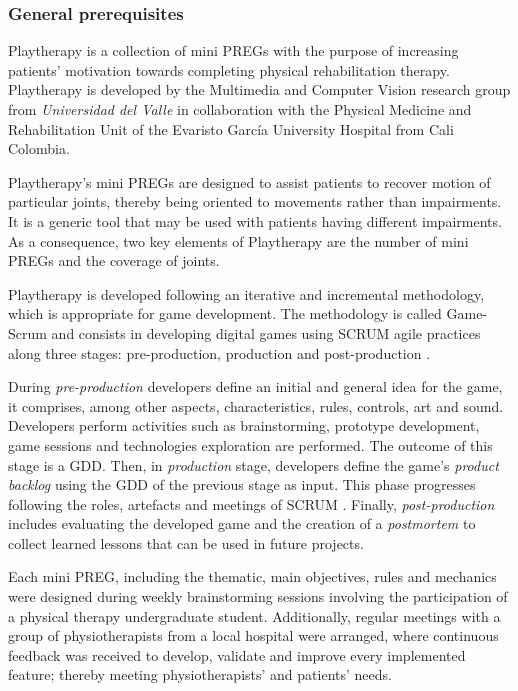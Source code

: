 \subsubsection{General prerequisites}
Playtherapy is a collection of mini \acp{PREG} with the purpose of increasing patients' motivation towards completing physical rehabilitation therapy. Playtherapy is developed by the Multimedia and Computer Vision research group from \textit{Universidad del Valle} in collaboration with the Physical Medicine and Rehabilitation Unit of the Evaristo Garc\'ia University Hospital from Cali Colombia. 

Playtherapy's mini \acp{PREG} are designed to assist patients to recover motion of particular joints, thereby being oriented to movements rather than impairments. It is a generic tool that may be used with patients having different impairments. As a consequence, two key elements of Playtherapy are the number of mini \acp{PREG} and the coverage of joints.

Playtherapy is developed following an iterative and incremental methodology, which is appropriate for game development. The methodology is called Game-Scrum and consists in developing digital games using SCRUM agile practices along three stages: pre-production, production and post-production \autocite{godoy2010game}.

During \emph{pre-production} developers define an initial and general idea for the game, it comprises, among other aspects, characteristics, rules, controls, art and sound. Developers perform activities such as brainstorming, prototype development, game sessions and technologies exploration are performed. The outcome of this stage is a \ac{GDD}. Then, in \emph{production} stage, developers define the game's \textit{product backlog} using the \ac{GDD} of the previous stage as input. This phase progresses following the roles, artefacts and meetings of SCRUM \autocite{keith_agile_2010}. Finally, \emph{post-production} includes evaluating the developed game and the creation of a \textit{postmortem} to collect learned lessons that can be used in future projects.

Each mini \ac{PREG}, including the thematic, main objectives, rules and mechanics were designed during weekly brainstorming sessions involving the participation of a physical therapy undergraduate student. Additionally, regular meetings with a group of physiotherapists from a local hospital were arranged, where continuous feedback was received to develop, validate and improve every implemented feature; thereby meeting physiotherapists' and patients' needs.

